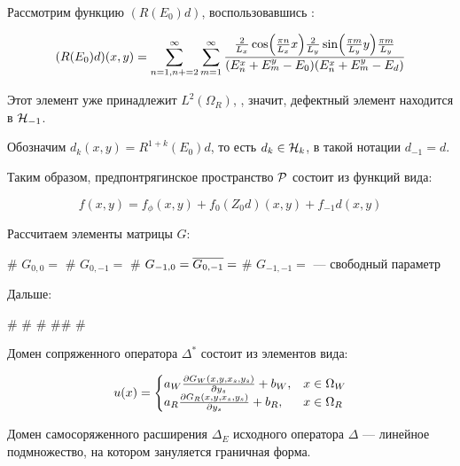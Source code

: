 Рассмотрим функцию $(R(E_0) d)$, воспользовавшись :

\[
(R(E_0) d)(x, y)
= \sum\limits_{n = 1, n += 2}^\infty \sum\limits_{m = 1}^\infty \frac{\frac{2}{L_x} \cos(\frac{\pi n}{L_x} x) \frac{2}{L_y} \sin(\frac{\pi m}{L_y} y)\frac{\pi m}{L_y}}{(E^x_n + E^y_m - E_0)(E^x_n + E^y_m - E_d)} \\
\]

Этот элемент уже принадлежит $L^2(\Omega_R)$, , значит, дефектный элемент находится в $\mathcal{H}_{-1}$.

Обозначим $d_k(x, y) = R^{1 + k}(E_0) d$, то есть $d_k \in \mathcal{H}_{k}$, в такой нотации $d_{-1} = d$.

Таким образом, предпонтрягинское пространство $\mathcal{P}$ состоит из функций вида:

\[
f(x, y) = f_\phi(x, y) + f_0 (Z_0 d)(x, y) + f_{-1} d(x, y)
\]

Рассчитаем элементы матрицы $G$:

\begin{ilist}
# $G_{0, 0} = $ 
# $G_{0, -1} = $ 
# $G_{-1, 0} = \overline{G_{0, -1}} = $ 
# $G_{-1, -1} = $ — свободный параметр 
\end{ilist}

Дальше:

\begin{elist}
# 
# 
# 
## 
# 
\end{elist}


Домен сопряженного оператора $\Delta^*$ состоит из элементов вида:

\[
u(x) = \begin{cases}
a_W \pdv{G_W(x, y, x_s, y_s)}{y_s} (x_s = x_0, x_s = y_0) + b_W, & x \in \Omega_W \\
a_R \pdv{G_R(x, y, x_s, y_s)}{y_s} (x_s = x_0, x_s = y_0) + b_R, & x \in \Omega_R \\
\end{cases}
\]

Домен самосоряженного расширения $\Delta_E$ исходного оператора $\Delta$ — линейное подмножество, на котором зануляется граничная форма. 

